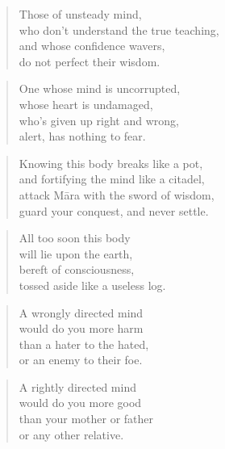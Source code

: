 \documentclass[12pt,openany]{book}%
\begin{document}
\begin{verse}%
Those of unsteady mind, \\
who don’t understand the true teaching, \\
and whose confidence wavers, \\
do not perfect their wisdom. 

%
\end{verse}

\begin{verse}%
One whose mind is uncorrupted, \\
whose heart is undamaged, \\
who’s given up right and wrong, \\
alert, has nothing to fear. 

%
\end{verse}

\begin{verse}%
Knowing this body breaks like a pot, \\
and fortifying the mind like a citadel, \\
attack \textsanskrit{Māra} with the sword of wisdom, \\
guard your conquest, and never settle. 

%
\end{verse}

\begin{verse}%
All too soon this body \\
will lie upon the earth, \\
bereft of consciousness, \\
tossed aside like a useless log. 

%
\end{verse}

\begin{verse}%
A wrongly directed mind \\
would do you more harm \\
than a hater to the hated, \\
or an enemy to their foe. 

%
\end{verse}

\begin{verse}%
A rightly directed mind \\
would do you more good \\
than your mother or father \\
or any other relative. 

%
\end{verse}
\end{document}
